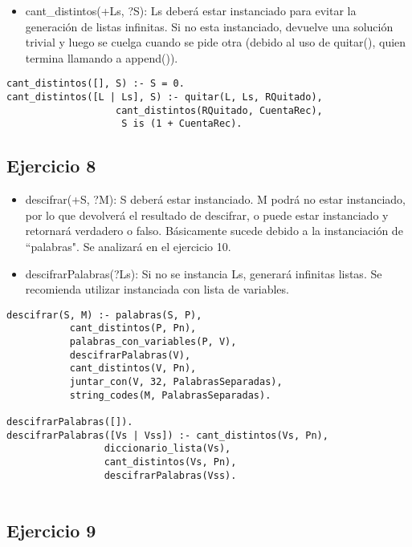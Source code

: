 \documentclass[spanish, 10pt,a4paper]{article}
\numberwithin{equation}{section} %
\begin{document}
\begin{itemize}
\item cant\_distintos(+Ls, ?S): Ls deberá estar instanciado para evitar la generación de listas infinitas. Si no esta instanciado, devuelve una solución trivial y luego se cuelga 
cuando se pide otra (debido al uso de quitar(), quien termina llamando a append()).
\end{itemize}
\begin{lstlisting}
cant_distintos([], S) :- S = 0.
cant_distintos([L | Ls], S) :- quitar(L, Ls, RQuitado), 
			       cant_distintos(RQuitado, CuentaRec), 
			        S is (1 + CuentaRec).
\end{lstlisting}


\subsection{Ejercicio 8}

\begin{itemize}
\item descifrar(+S, ?M): S deberá estar instanciado. M podrá no estar instanciado, por lo que devolverá el resultado de descifrar, o puede estar instanciado y retornará verdadero o falso. Básicamente sucede debido a la instanciación de ``palabras". Se analizará en el ejercicio 10.

\item descifrarPalabras(?Ls): Si no se instancia Ls, generará infinitas listas. Se recomienda utilizar instanciada con lista de variables.
\end{itemize}
\begin{lstlisting}
descifrar(S, M) :- palabras(S, P),
		   cant_distintos(P, Pn), 	
		   palabras_con_variables(P, V), 
		   descifrarPalabras(V),
		   cant_distintos(V, Pn),
		   juntar_con(V, 32, PalabrasSeparadas), 
		   string_codes(M, PalabrasSeparadas).

descifrarPalabras([]).
descifrarPalabras([Vs | Vss]) :- cant_distintos(Vs, Pn),
			 	 diccionario_lista(Vs), 
				 cant_distintos(Vs, Pn),
				 descifrarPalabras(Vss).
											 
\end{lstlisting}


\subsection{Ejercicio 9}
\end{document}
